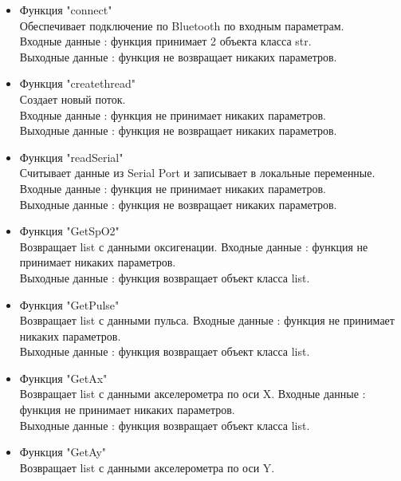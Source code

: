 \documentclass[a4document]{article}
\begin{document}
{\begin{itemize}
\begin{itemize}
            \item Функция "connect" \\
                Обеспечивает подключение по Bluetooth по входным параметрам. \\
                Входные данные : функция принимает 2 объекта класса str. \\ 
                Выходные данные : функция не возвращает никаких параметров.
            
            \item Функция "createthread" \\
                Создает новый поток. \\
                Входные данные : функция не принимает никаких параметров. \\ 
                Выходные данные : функция не возвращает никаких параметров.
            \newpage
            \item Функция "readSerial" \\
                Считывает данные из Serial Port и записывает в локальные переменные. \\
                Входные данные : функция не принимает никаких параметров. \\ 
                Выходные данные : функция не возвращает никаких параметров.
            \item Функция "GetSpO2" \\
                Возвращает list с данными оксигенации.
                Входные данные : функция не принимает никаких параметров. \\ 
                Выходные данные : функция возвращает объект класса list.
            \item Функция "GetPulse" \\
                Возвращает list с данными пульса.
                Входные данные : функция не принимает никаких параметров. \\ 
                Выходные данные : функция возвращает объект класса list.
            \item Функция "GetAx" \\
                Возвращает list с данными акселерометра по оси X.
                Входные данные : функция не принимает никаких параметров. \\ 
                Выходные данные : функция возвращает объект класса list.
            \item Функция "GetAy" \\
                Возвращает list с данными акселерометра по оси Y.

\end{itemize}
\end{itemize}}
\end{document}
